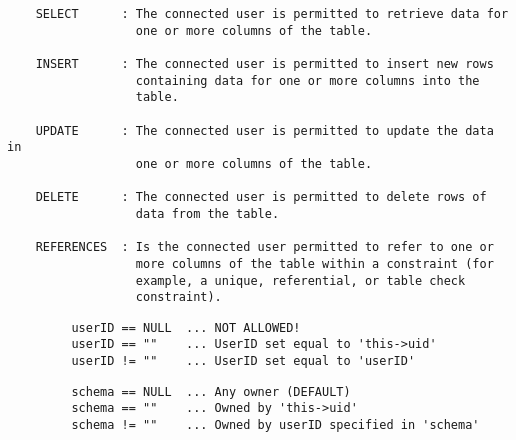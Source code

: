 \begin{verbatim}
    SELECT      : The connected user is permitted to retrieve data for 
                  one or more columns of the table.

    INSERT      : The connected user is permitted to insert new rows 
                  containing data for one or more columns into the 
                  table.

    UPDATE      : The connected user is permitted to update the data in 
                  one or more columns of the table.

    DELETE      : The connected user is permitted to delete rows of 
                  data from the table.

    REFERENCES  : Is the connected user permitted to refer to one or 
                  more columns of the table within a constraint (for 
                  example, a unique, referential, or table check 
                  constraint).
\end{verbatim}
\begin{verbatim}
         userID == NULL  ... NOT ALLOWED!
         userID == ""    ... UserID set equal to 'this->uid'
         userID != ""    ... UserID set equal to 'userID'
\end{verbatim}

\begin{verbatim}
         schema == NULL  ... Any owner (DEFAULT)
         schema == ""    ... Owned by 'this->uid'
         schema != ""    ... Owned by userID specified in 'schema'
\end{verbatim}



